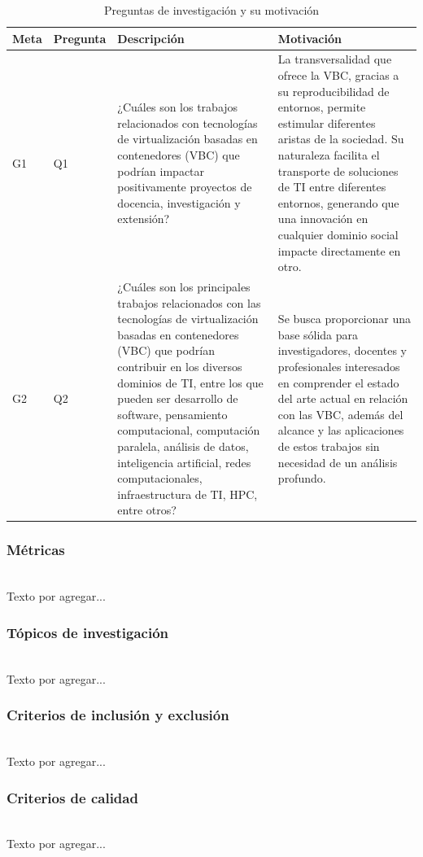 \begin{table}[!t]
\centering

\renewcommand{\arraystretch}{1.4}
\begin{tabularx}{\textwidth}{>{\centering\arraybackslash}m{} >{\centering\arraybackslash}m{} >{\RaggedRight\arraybackslash}X >{\RaggedRight\arraybackslash}X}
\toprule
\textbf{Meta} & \textbf{Pregunta} & \textbf{Descripción} & \textbf{Motivación} \\
\midrule
G1 & Q1 & ¿Cuáles son los trabajos relacionados con tecnologías de virtualización basadas en contenedores (VBC) que podrían impactar positivamente proyectos de docencia, investigación y extensión? & La transversalidad que ofrece la VBC, gracias a su reproducibilidad de entornos, permite estimular diferentes aristas de la sociedad. Su naturaleza facilita el transporte de soluciones de TI entre diferentes entornos, generando que una innovación en cualquier dominio social impacte directamente en otro. \\
\midrule
G2 & Q2 & ¿Cuáles son los principales trabajos relacionados con las tecnologías de virtualización basadas en contenedores (VBC) que podrían contribuir en los diversos dominios de TI, entre los que pueden ser desarrollo de software, pensamiento computacional, computación paralela, análisis de datos, inteligencia artificial, redes computacionales, infraestructura de TI, HPC, entre otros? & Se busca proporcionar una base sólida para investigadores, docentes y profesionales interesados en comprender el estado del arte actual en relación con las VBC, además del alcance y las aplicaciones de estos trabajos sin necesidad de un análisis profundo. \\
\bottomrule
\end{tabularx}\label{tab:preguntas}
\caption{Preguntas de investigación y su motivación}
\end{table}

\subsubsection{Métricas}
\mbox{}\\
Texto por agregar...

\subsubsection{Tópicos de investigación}
\mbox{}\\
Texto por agregar...

\subsubsection{Criterios de inclusión y exclusión}
\mbox{}\\
Texto por agregar...

\subsubsection{Criterios de calidad}
\mbox{}\\
Texto por agregar...